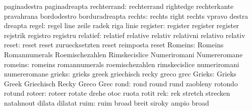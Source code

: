                            paginadestra              paginadreapta
              rechterrand: rechterrand               rightedge
                           rechterkante              pravahrana
                           bordodestro               borduradreapta
                   rechts: rechts                    right
                           rechts                    vpravo
                           destra                    dreapta
                    regel: regel                     line
                           zeile                     radek
                           riga                      linie
                 register: register                  register
                           register                  rejstrik
                           registro                  registru
                 relatief: relatief                  relative
                           relativ                   relativni
                           relativo                  relativ
                    reset: reset                     reset
                           zuruecksetzten            reset
                           reimposta                 reset
                  Romeins: Romeins                   Romannumerals
                           Roemischezahlen           Rimskecislice
                           Numeriromani              Numereromane
                  romeins: romeins                   romannumerals
                           roemischezahlen           rimskecislice
                           numeriromani              numereromane
                   grieks: grieks                    greek
                           griechisch                recky
                           greco                     grec
                   Grieks: Grieks                    Greek
                           Griechisch                Recky
                           Greco                     Grec
                     rond: rond                      round
                           rund                      zaobleny
                           rotondo                   rotund
                   roteer: roteer                    rotate
                           drehe                     otoc
                           ruota                     rotit
                      rek: rek                       stretch
                           strecken                  natahnout
                           dilata                    dilatat
                     ruim: ruim                      broad
                           breit                     siroky
                           ampio                     broad
